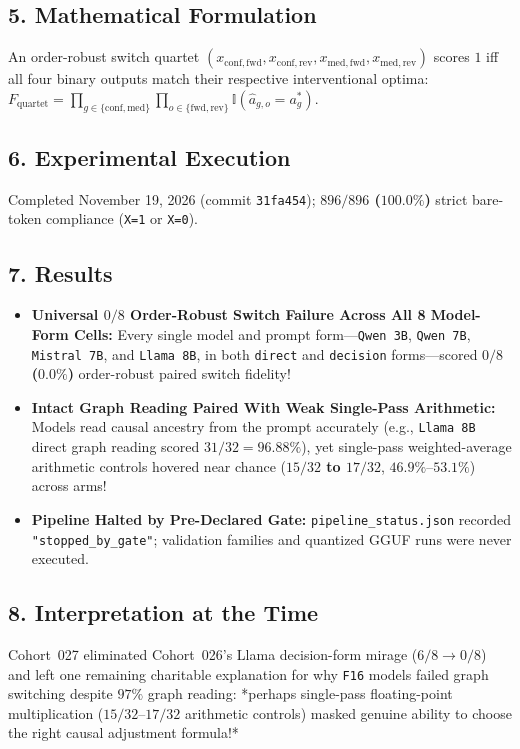 \subsection*{5. Mathematical Formulation}
An order-robust switch quartet $(x_{\mathrm{conf,fwd}}, x_{\mathrm{conf,rev}}, x_{\mathrm{med,fwd}}, x_{\mathrm{med,rev}})$ scores $1$ iff all four binary outputs match their respective interventional optima: $F_{\mathrm{quartet}} = \prod_{g\in\{\mathrm{conf},\mathrm{med}\}} \prod_{o\in\{\mathrm{fwd},\mathrm{rev}\}} \mathbb{I}(\hat{a}_{g,o} = a^*_g)$.

\subsection*{6. Experimental Execution}
Completed November 19, 2026 (commit \texttt{31fa454}); \textbf{$896/896$ ($100.0\%$)} strict bare-token compliance (\texttt{X=1} or \texttt{X=0}).

\subsection*{7. Results}
\begin{itemize}
  \item \textbf{Universal $0/8$ Order-Robust Switch Failure Across All 8 Model-Form Cells:} Every single model and prompt form---\texttt{Qwen 3B}, \texttt{Qwen 7B}, \texttt{Mistral 7B}, and \texttt{Llama 8B}, in both \texttt{direct} and \texttt{decision} forms---scored \textbf{$0/8$ ($0.0\%$)} order-robust paired switch fidelity!
  \item \textbf{Intact Graph Reading Paired With Weak Single-Pass Arithmetic:} Models read causal ancestry from the prompt accurately (e.g., \texttt{Llama 8B} direct graph reading scored \textbf{$31/32 = 96.88\%$}), yet single-pass weighted-average arithmetic controls hovered near chance (\textbf{$15/32$ to $17/32$}, $46.9\%$--$53.1\%$) across arms!
  \item \textbf{Pipeline Halted by Pre-Declared Gate:} \texttt{pipeline\_status.json} recorded \texttt{"stopped\_by\_gate"}; validation families and quantized GGUF runs were never executed.
\end{itemize}

\subsection*{8. Interpretation at the Time}
Cohort~027 eliminated Cohort~026's Llama decision-form mirage ($6/8 \to 0/8$) and left one remaining charitable explanation for why \texttt{F16} models failed graph switching despite $97\%$ graph reading: *perhaps single-pass floating-point multiplication ($15/32$--$17/32$ arithmetic controls) masked genuine ability to choose the right causal adjustment formula!*

